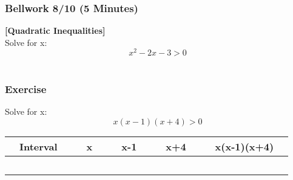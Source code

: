 \documentclass[12pt]{beamer}
\begin{document}
\begin{frame}
	\frametitle{Bellwork 8/10 (5 Minutes)}
	\initclock
	\textbf{[Quadratic Inequalities]}\vspace{.2cm}\\
	\vspace*{\fill}
	Solve for x:
	\vspace*{\fill}
	\[x^2-2x-3>0\]\\
	\vspace*{\fill}
	\vspace*{\fill}
	\vspace*{\fill}
	\vspace*{\fill}
	\crono
\end{frame}
\begin{frame}
	\frametitle{Exercise}
	\vspace*{\fill}
	\vspace*{\fill}
	\vspace*{\fill}
	\initclock
	Solve for x:
	\vspace*{\fill}
	\[x(x-1)(x+4)>0\]
	\begin{center}
		\begin{table}[]
			\small
			\begin{tabular}{|l|l|l|l|l|}
				\hline
				$\quad$Interval$\quad$ & $\quad$x$\quad$ & $\quad$x-1$\quad$ & $\quad$x+4$\quad$ & $\quad$x(x-1)(x+4)$\quad$ \\
				\hline
				                       &                 &                   &                   &                           \\
				                       &                 &                   &                   &                           \\
				                       &                 &                   &                   &                           \\
				                       &                 &                   &                   &                           \\
				                       &                 &                   &                   &                           \\
				\hline
			\end{tabular}
		\end{table}
	\end{center}
	\vspace*{\fill}
	\vspace*{\fill}
	\vspace*{\fill}
	\vspace*{\fill}
\end{frame}
\end{document}
